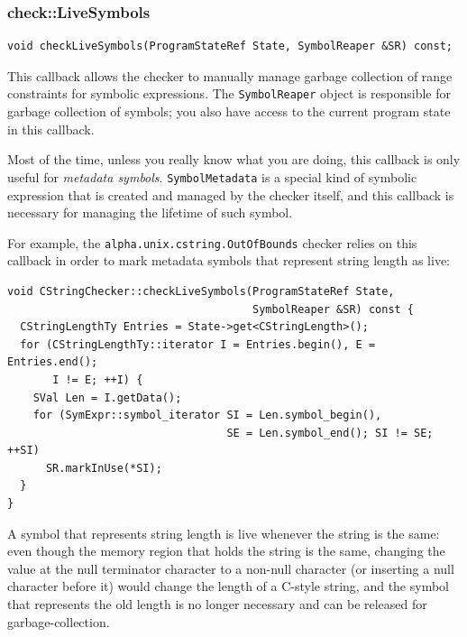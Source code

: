 \documentclass[a4paper,12pt]{article}
\newenvironment{nobr}{\begin{minipage}{\textwidth}\setlength\parskip{1em}
}{\end{minipage}\ignorespacesafterend}
\begin{document}
\begin{nobr}
\subsubsection{check::LiveSymbols}

\begin{lstlisting}[style=cplusplus,numbers=none]
void checkLiveSymbols(ProgramStateRef State, SymbolReaper &SR) const;
\end{lstlisting}

This callback allows the checker to manually manage garbage collection of range constraints for symbolic expressions. The \lstinline|SymbolReaper| object is responsible for garbage collection of symbols; you also have access to the current program state in this callback.
\end{nobr}

Most of the time, unless you really know what you are doing, this callback is only useful for \emph{metadata symbols}. \lstinline|SymbolMetadata| is a special kind of symbolic expression that is created and managed by the checker itself, and this callback is necessary for managing the lifetime of such symbol.

\begin{nobr}
For example, the \lstinline|alpha.unix.cstring.OutOfBounds| checker relies on this callback in order to mark metadata symbols that represent string length as live:

\begin{lstlisting}[style=cplusplus]
void CStringChecker::checkLiveSymbols(ProgramStateRef State,
                                      SymbolReaper &SR) const {
  CStringLengthTy Entries = State->get<CStringLength>();
  for (CStringLengthTy::iterator I = Entries.begin(), E = Entries.end();
       I != E; ++I) {
    SVal Len = I.getData();
    for (SymExpr::symbol_iterator SI = Len.symbol_begin(),
                                  SE = Len.symbol_end(); SI != SE; ++SI)
      SR.markInUse(*SI);
  }
}
\end{lstlisting}
\end{nobr}

A symbol that represents string length is live whenever the string is the same: even though the memory region that holds the string is the same, changing the value at the null terminator character to a non-null character (or inserting a null character before it) would change the length of a C-style string, and the symbol that represents the old length is no longer necessary and can be released for garbage-collection.
\end{document}
